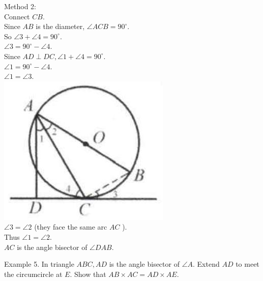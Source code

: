 \documentclass[10pt]{article}
\begin{document}
Method 2:\\
Connect \(C B\).\\
Since \(A B\) is the diameter, \(\angle A C B=90^{\circ}\).\\
So \(\angle 3+\angle 4=90^{\circ}\).\\
\(\angle 3=90^{\circ}-\angle 4\).\\
Since \(A D \perp D C, \angle 1+\angle 4=90^{\circ}\).\\
\(\angle 1=90^{\circ}-\angle 4\).\\
\(\angle 1=\angle 3\).\\
\includegraphics[max width=\textwidth, center]{2025_04_17_97bc1f7e44d93c271a88g-164(3)}\\
\(\angle 3=\angle 2\) (they face the same arc \(A C\) ).\\
Thus \(\angle 1=\angle 2\).\\
\(A C\) is the angle bisector of \(\angle D A B\).


Example 5. In triangle \(A B C, A D\) is the angle bisector of \(\angle A\). Extend \(A D\) to meet the circumcircle at \(E\). Show that \(A B \times A C=A D \times A E\).
\end{document}
